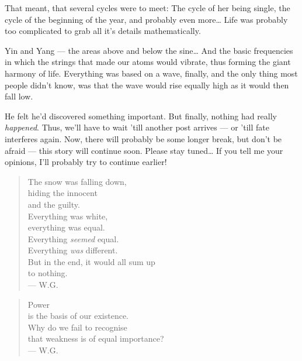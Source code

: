 That meant, that several cycles were to meet: The cycle of her being single, the cycle of the beginning of the year, and probably even more\ldots
Life was probably too complicated to grab all it's details mathematically.

Yin and Yang --- the areas above and below the sine\ldots
And the basic frequencies in which the strings that made our atoms would vibrate, thus forming the giant harmony of life. 
Everything was based on a wave, finally, and the only thing most people didn't know, was that the wave would rise equally high as it would then fall low.

He felt he'd discovered something important. 
But finally, nothing had really \emph{happened}. 
Thus, we'll have to wait 'till another post arrives --- or 'till fate interferes again. 
Now, there will probably be some longer break, but don't be afraid --- this story will continue soon. 
Please stay tuned\ldots
If you tell me your opinions, I'll probably try to continue earlier!

\begin{quote}
The snow was falling down, \\
hiding the innocent \\
and the guilty. \\
Everything was white, \\
everything was equal. \\
Everything \emph{seemed} equal. \\
Everything \emph{was} different. \\
But in the end, it would all sum up \\
to nothing. \\
--- W.G.
\end{quote}

\begin{quote}
Power \\
is the basis of our existence. \\
Why do we fail to recognise \\
that weakness is of equal importance? \\
--- W.G.
\end{quote}

